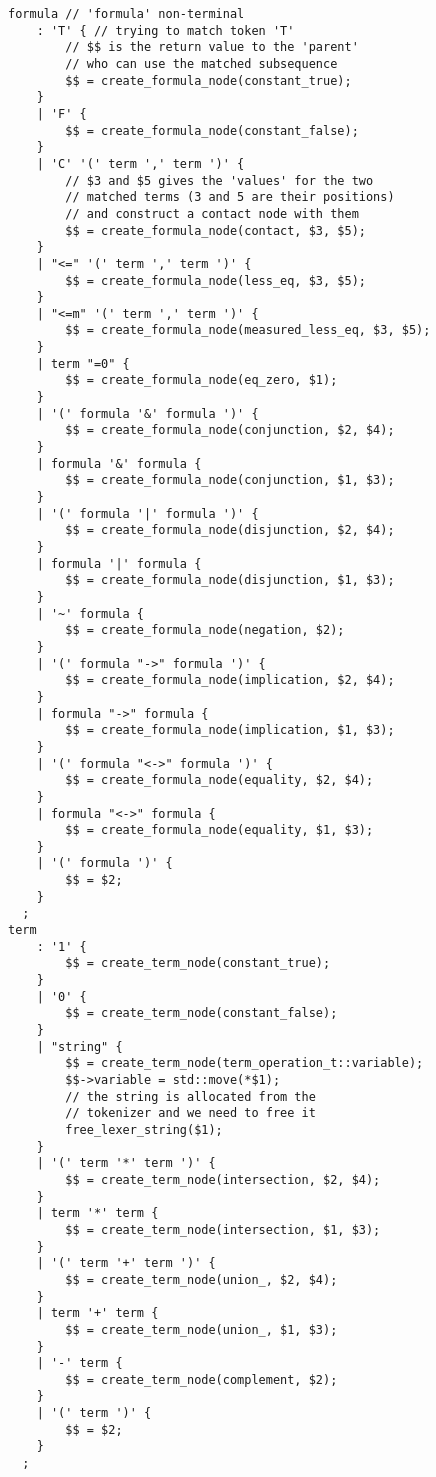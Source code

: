 \documentclass{article}
\begin{document}
		\begin{lstlisting}
formula // 'formula' non-terminal
    : 'T' { // trying to match token 'T'
        // $$ is the return value to the 'parent' 
        // who can use the matched subsequence
        $$ = create_formula_node(constant_true);   
    }
    | 'F' {
        $$ = create_formula_node(constant_false);
    }
    | 'C' '(' term ',' term ')' {                  
        // $3 and $5 gives the 'values' for the two 
        // matched terms (3 and 5 are their positions) 
        // and construct a contact node with them
        $$ = create_formula_node(contact, $3, $5); 
    }
    | "<=" '(' term ',' term ')' {
        $$ = create_formula_node(less_eq, $3, $5);
    }
    | "<=m" '(' term ',' term ')' {
        $$ = create_formula_node(measured_less_eq, $3, $5);
    }
    | term "=0" {
        $$ = create_formula_node(eq_zero, $1);
    }
    | '(' formula '&' formula ')' {
        $$ = create_formula_node(conjunction, $2, $4);
    }
    | formula '&' formula {
        $$ = create_formula_node(conjunction, $1, $3);
    }
    | '(' formula '|' formula ')' {
        $$ = create_formula_node(disjunction, $2, $4);
    }
    | formula '|' formula {
        $$ = create_formula_node(disjunction, $1, $3);
    }
    | '~' formula {
        $$ = create_formula_node(negation, $2);
    }
    | '(' formula "->" formula ')' {
        $$ = create_formula_node(implication, $2, $4);
    }
    | formula "->" formula {
        $$ = create_formula_node(implication, $1, $3);
    }
    | '(' formula "<->" formula ')' {
        $$ = create_formula_node(equality, $2, $4);
    }
    | formula "<->" formula {
        $$ = create_formula_node(equality, $1, $3);
    }
    | '(' formula ')' {
        $$ = $2;
    }
  ;
term
    : '1' {
        $$ = create_term_node(constant_true);
    }
    | '0' {
        $$ = create_term_node(constant_false);
    }
    | "string" {
        $$ = create_term_node(term_operation_t::variable);
        $$->variable = std::move(*$1);
        // the string is allocated from the
        // tokenizer and we need to free it
        free_lexer_string($1); 
    }
    | '(' term '*' term ')' {
        $$ = create_term_node(intersection, $2, $4);
    }
    | term '*' term {
        $$ = create_term_node(intersection, $1, $3);
    }
    | '(' term '+' term ')' {
        $$ = create_term_node(union_, $2, $4);
    }
    | term '+' term {
        $$ = create_term_node(union_, $1, $3);
    }
    | '-' term {
        $$ = create_term_node(complement, $2);
    }
    | '(' term ')' {
        $$ = $2;
    }
  ;
		\end{lstlisting}
\end{document}
